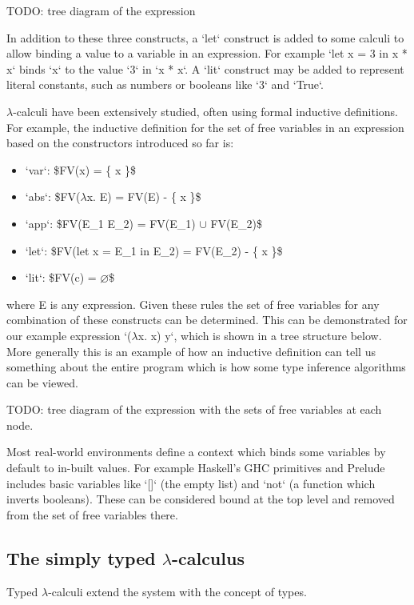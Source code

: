 \documentclass[a4paper,fleqn,12pt]{article}
\begin{document}
TODO: tree diagram of the expression

In addition to these three constructs, a `let` construct is added to some calculi to allow binding a value to a variable in an expression. For example `let x = 3 in x * x` binds `x` to the value `3` in `x * x`. A `lit` construct may be added to represent literal constants, such as numbers or booleans like `3` and `True`.

$\lambda$-calculi have been extensively studied, often using formal inductive definitions. For example, the inductive definition for the set of free variables in an expression based on the constructors introduced so far is:

\begin{itemize}
  \item `var`: \$FV(x) = \{ x \}\$
  \item `abs`: \$FV($\lambda$x. E) = FV(E) - \{ x \}\$
  \item `app`: \$FV(E\_1 E\_2) = FV(E\_1) $\cup$ FV(E\_2)\$
  \item `let`: \$FV(let x = E\_1 in E\_2) = FV(E\_2) - \{ x \}\$
  \item `lit`: \$FV(c) = $\varnothing$\$
\end{itemize}

where E is any expression. Given these rules the set of free variables for any combination of these constructs can be determined. This can be demonstrated for our example expression `($\lambda$x. x) y`, which is shown in a tree structure below. More generally this is an example of how an inductive definition can tell us something about the entire program which is how some type inference algorithms can be viewed.

TODO: tree diagram of the expression with the sets of free variables at each node.

Most real-world environments define a context which binds some variables by default to in-built values. For example Haskell’s GHC primitives and Prelude includes basic variables like `[]` (the empty list) and `not` (a function which inverts booleans). These can be considered bound at the top level and removed from the set of free variables there.

\subsection{The simply typed $\lambda$-calculus}\label{id:h.w7vj0r89b86n}

Typed $\lambda$-calculi extend the system with the concept of types.
\end{document}
